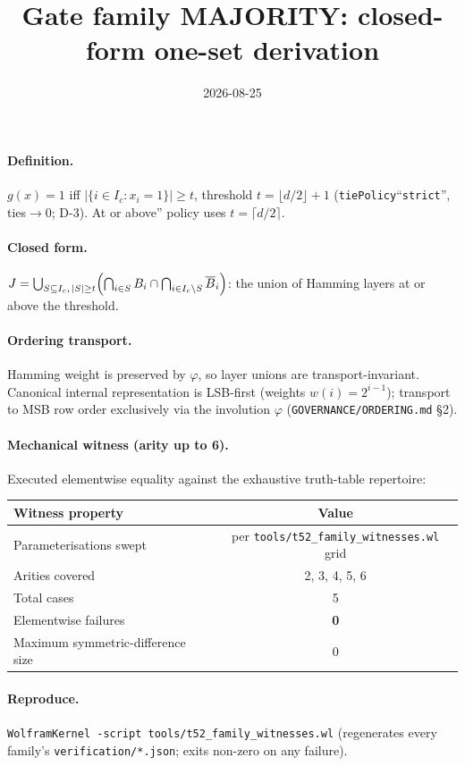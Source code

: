 \documentclass{article}
\title{Gate family MAJORITY: closed-form one-set derivation}
\date{2026-08-25}
\begin{document}
\maketitle

\paragraph{Definition.} $g(x)=1$ iff $|\{i\in I_c:x_i=1\}|\ge t$, threshold $t=\lfloor d/2\rfloor+1$ (\texttt{tiePolicy}``\texttt{strict}'', ties$\to$0; D-3). At or above'' policy uses $t=\lceil d/2\rceil$.

\paragraph{Closed form.} $J=\bigcup_{S\subseteq I_c,\,|S|\ge t}\Bigl(\bigcap_{i\in S}B_i\cap\bigcap_{i\in I_c\setminus S}\overline{B}_i\Bigr)$: the union of Hamming layers at or above the threshold.

\paragraph{Ordering transport.} Hamming weight is preserved by $\varphi$, so layer unions are transport-invariant.
Canonical internal representation is LSB-first (weights $w(i)=2^{i-1}$);
transport to MSB row order exclusively via the involution $\varphi$
(\texttt{GOVERNANCE/ORDERING.md} \S2).

\paragraph{Mechanical witness (arity up to 6).} Executed elementwise equality
against the exhaustive truth-table repertoire:
\begin{center}
\begin{tabular}{lc}
\hline
Witness property & Value \\ \hline
Parameterisations swept & per \texttt{tools/t52_family_witnesses.wl} grid \\
Arities covered & 2, 3, 4, 5, 6 \\
Total cases & 5 \\
Elementwise failures & \textbf{0} \\
Maximum symmetric-difference size & 0 \\ \hline
\end{tabular}
\end{center}

\paragraph{Reproduce.} \texttt{WolframKernel -script tools/t52_family_witnesses.wl}
(regenerates every family's \texttt{verification/*.json}; exits non-zero on any failure).
\end{document}
